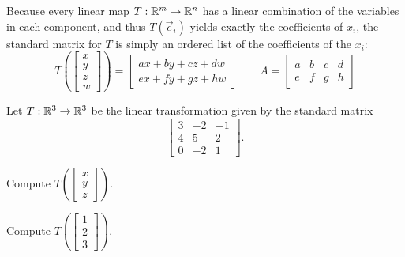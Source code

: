 \begin{fact}
  Because every linear map \(T:\mathbb{R}^m\to\mathbb{R}^n\) has a linear combination
  of the variables in each component, and thus
  \(T(\vec e_i)\) yields exactly the coefficients of \(x_i\),
  the standard matrix for \(T\) is simply an ordered list of
  the coefficients of the \(x_i\):
  \[
    T\left(\begin{bmatrix}x\\y\\z\\w\end{bmatrix}\right)
      =
    \begin{bmatrix}
      ax+by+cz+dw \\
      ex+fy+gz+hw
    \end{bmatrix}
  \hspace{2em}
    A
      =
    \begin{bmatrix}
      a & b & c & d \\
      e & f & g & h
    \end{bmatrix}
  \]
\end{fact}

\begin{activity}{5}
  Let \(T: \mathbb{R}^3 \rightarrow \mathbb{R}^3\) be the linear transformation given by the standard matrix
  \[
    \begin{bmatrix} 3  & -2 & -1  \\ 4 & 5 & 2 \\ 0 & -2 & 1 \end{bmatrix}
  .\]

\begin{subactivity}
Compute \(T\left(\begin{bmatrix} x\\ y \\ z \end{bmatrix} \right) \).
\end{subactivity}
\begin{subactivity}
Compute \(T\left(\begin{bmatrix} 1\\ 2 \\ 3 \end{bmatrix} \right) \).
\end{subactivity}
\end{activity}

